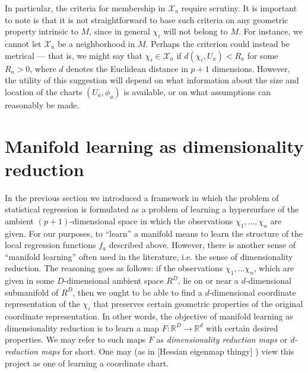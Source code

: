 \documentclass[11pt]{article}
\newcommand{\R}{\ensuremath{\mathbb{R}}}
\numberwithin{equation}{section}
\begin{document}
In particular, the criteria for membership in $\mathcal{X}_a$ require scrutiny. It is important to note is that it is not straightforward to base such criteria on any geometric property intrinsic to $M$, since in general $\chi_i$ will not belong to $M$. For instance, we cannot let $\mathcal{X}_a$ be a neighborhood in $M$. Perhaps the criterion could instead be metrical --- that is, we might say that $\chi_i \in \mathcal{X}_a$ if $d(\chi_i, U_a) < R_a$ for some $R_a > 0$, where $d$ denotes the Euclidean distance in $p+1$ dimensions. However, the utility of this suggestion will depend on what information about the size and location of the charts $(U_a, \phi_a)$ is available, or on what assumptions can reasonably be made. 

\section{Manifold learning as dimensionality reduction}

In the previous section we introduced a framework in which the problem of statistical regression is formulated as a problem of learning a hypersurface of the ambient $(p+1)$-dimensional space in which the observations $\chi_1, \ldots, \chi_n$ are given. For our purposes, to ``learn'' a manifold means to learn the structure of the local regression functions $f_a$ described above. However, there is another sense of ``manifold learning'' often used in the literature, i.e. the sense of dimensionality reduction. The reasoning goes as follows: if the observations $\chi_1, \ldots \chi_n$, which are given in some $D$-dimensional ambient space $R^D$, lie on or near a $d$-dimensional submanifold of $R^D$, then we ought to be able to find a $d$-dimensional coordinate representation of the $\chi_i$ that preserves certain geometric properties of the original coordinate representation. In other words, the objective of manifold learning as dimensionality reduction is to learn a map $F: \R^D \to \R^d$ with certain desired properties. We may refer to such maps $F$ as \emph{dimensionality reduction maps} or \emph{d-reduction maps} for short. One may (as in [Hessian eigenmap thingy] ) view this project as one of learning a coordinate chart.
\end{document}
